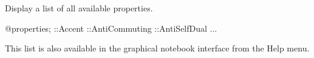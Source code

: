 
Display a list of all available properties.
\begin{screen}{1}
@properties;
::Accent
::AntiCommuting
::AntiSelfDual
...
\end{screen}
This list is also available in the graphical notebook interface from
the Help menu.

